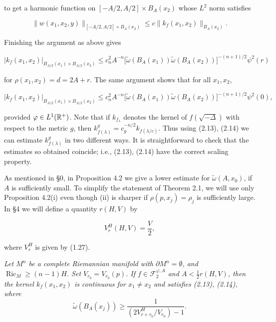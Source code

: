 to get a harmonic function on $[-A/2,A/2]\times B_A(x_2)$ whose $L^2$ norm satisfies

\begin{equation}\tag{2.12}
\|w(x_1,x_2,y)\|_{[-A/2,A/2]\times B_A(x_2)}
\le c\|k_f(x_1,x_2)\|_{B_A(x_2)}.
\end{equation}

Finishing the argument as above gives

\begin{equation}\tag{2.13}
\left|k_f(x_1,x_2)\right|_{B_{A/2}(x_1)\times B_{A/2}(x_2)}
\le c_n^2A^{-n}\bigl[\tilde{\omega}(B_A(x_1))\tilde{\omega}(B_A(x_2))\bigr]^{-(n+1)/2}\psi^2(r)
\end{equation}

for $\rho(x_1,x_2)=d=2A+r$. The same argument shows that for all $x_1,x_2$,

\begin{equation}\tag{2.14}
\left|k_f(x_1,x_2)\right|_{B_{A/2}(x_1)\times B_{A/2}(x_2)}
\le c_n^2A^{-n}\bigl[\tilde{\omega}(B_A(x_1))\tilde{\omega}(B_A(x_2))\bigr]^{-(n+1)/2}\psi^2(0),
\end{equation}

provided $\varphi\in L^1(\mathbb{R}^+)$. Note that if $k_{f_\lambda}$ denotes the kernel of
$f(\sqrt{-\Delta})$ with respect to the metric $g$, then
$k^g_{f(\lambda)}=c^{-n/2}_g k_{f(\lambda/c)}$. Thus using (2.13), (2.14) we
can estimate $k^g_{f(\lambda)}$ in two different ways. It is straightforward to
check that the estimates so obtained coincide; i.e., (2.13), (2.14) have the
correct scaling property.

As mentioned in \S0, in Proposition 4.2 we give a lower estimate for
$\tilde{\omega}(A,x_0)$, if $A$ is sufficiently small. To simplify the statement
of Theorem 2.1, we will use only Proposition 4.2(i) even though (ii) is sharper
if $\rho(p,x_j)=\rho_j$ is sufficiently large. In \S4 we will define a quantity
$r(H,V)$ by

\begin{equation}\tag{2.15}
V_r^H(H,V)=\frac{V}{2},
\end{equation}

where $V_r^H$ is given by (1.27).

\begin{theorem}
\label{thm:kernel-estimates-ricci-lower-bound}
\textit{Let $M^n$ be a complete Riemannian manifold with $\partial M^n=\emptyset$, and $\operatorname{Ric}_M \ge (n-1)H$. Set $V_{r_0}=V_{r_0}(p)$. If $f \in \mathcal{F}^{\varphi,A}_2$ and $A < \frac12 r(H,V)$, then the kernel $k_f(x_1,x_2)$ is continuous for $x_1 \neq x_2$ and satisfies (2.13), (2.14), where}
\begin{equation}\tag{2.16}
\widetilde{\omega}(B_A(x_j)) \ge \frac{1}{\left(2V_{r+r_0}^{H}/V_{r_0}\right)-1}.
\end{equation}
\end{theorem}

